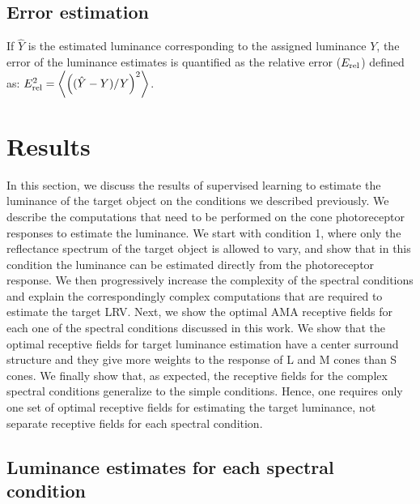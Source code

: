 \documentclass{jov}
\begin{document}
\subsection{Error estimation}
If $\hat{Y}$ is the estimated luminance corresponding to the assigned luminance $Y$, the error of the luminance estimates is quantified as the relative error ($E_{\rm rel}$) defined as: $E_{\rm rel}^2 = \left\langle\left((\hat{Y}-Y)/Y\right)^2\right\rangle$.



\section{Results} \label{Results}
In this section, we discuss the results of supervised learning to estimate the luminance of the target object on the conditions we described previously. We describe the computations that need to be performed on the cone photoreceptor responses to estimate the luminance. We start with condition 1, where only the reflectance spectrum of the target object is allowed to vary, and show that in this condition the luminance can be estimated directly from the photoreceptor response. We then progressively increase the complexity of the spectral conditions and explain the correspondingly complex computations that are required to estimate the target LRV. Next, we show the optimal AMA receptive fields for each one of the spectral conditions discussed in this work. We show that the optimal receptive fields for target luminance estimation have a center surround structure and they give more weights to the response of L and M cones than S cones. We finally show that, as expected, the receptive fields for the complex spectral conditions generalize to the simple conditions. Hence, one requires only one set of optimal receptive fields for estimating the target luminance, not separate receptive fields for each spectral condition.

\subsection{Luminance estimates for each spectral condition}
\end{document}
